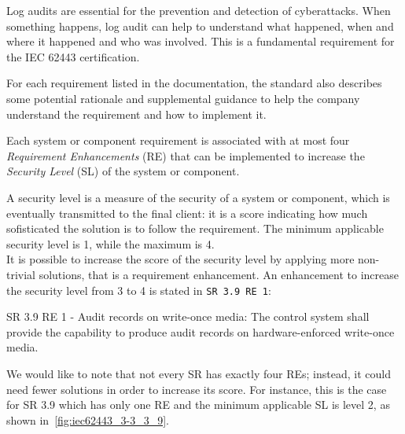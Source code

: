 Log audits are essential for the prevention and detection of cyberattacks. When something happens, log audit can help to understand what happened, when and where it happened and who was involved. This is a fundamental requirement for the IEC 62443 certification.

For each requirement listed in the documentation, the standard also describes some potential rationale and supplemental guidance to help the company understand the requirement and how to implement it.

Each system or component requirement is associated with at most four \textit{Requirement Enhancements} (RE) that can be implemented to increase the \textit{Security Level} (SL) of the system or component.

A security level is a measure of the security of a system or component, which is eventually transmitted to the final client: it is a score indicating how much sofisticated the solution is to follow the requirement. The minimum applicable security level is 1, while the maximum is 4.~\cite{iec-62443-ixon-practical-guide}\\
It is possible to increase the score of the security level by applying more non-trivial solutions, that is a requirement enhancement. An enhancement to increase the security level from 3 to 4 is stated in \texttt{SR 3.9 RE 1}:
\begin{mdframed}
  SR 3.9 RE 1 - Audit records on write-once media: The control system shall provide the capability to produce audit records on hardware-enforced write-once media.
\end{mdframed}\label{sr:3-3_3-9_re1}

We would like to note that not every SR has exactly four REs; instead, it could need fewer solutions in order to increase its score. For instance, this is the case for SR 3.9 which has only one RE and the minimum applicable SL is level 2, as shown in~\cref{fig:iec62443_3-3_3_9}.

